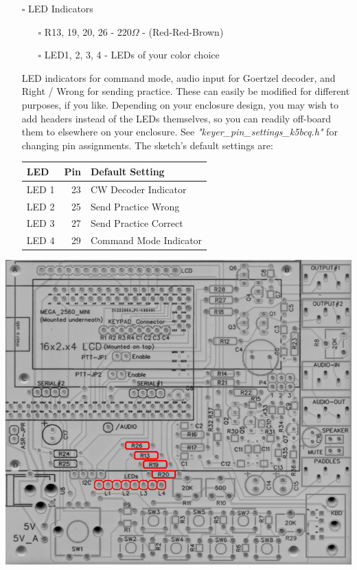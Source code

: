 \documentclass[11pt]{article}
\begin{document}
\newpage
\begin{itemize}
\item[{$\square$}] LED Indicators
\begin{itemize}
\item[{$\square$}] R13, 19, 20, 26 - 220\(\Omega\) - (Red-Red-Brown)
\item[{$\square$}] LED1, 2, 3, 4 - LEDs of your color choice
\end{itemize}

LED indicators for command mode, audio input for Goertzel decoder, and Right / Wrong for sending practice.  These can easily be modified for different purposes, if you like.  Depending on your enclosure design, you may wish to add headers instead of the LEDs themselves, so you can readily off-board them to elsewhere on your enclosure.  See \emph{"keyer\_pin\_settings\_k5bcq.h"} for changing pin assignments.  The sketch's default settings are:

\begin{center}
\begin{tabular}{lrl}
LED & Pin & Default Setting\\
\hline
LED 1 & 23 & CW Decoder Indicator\\
LED 2 & 25 & Send Practice Wrong\\
LED 3 & 27 & Send Practice Correct\\
LED 4 & 29 & Command Mode Indicator\\
\end{tabular}
\end{center}
\end{itemize}
\begin{center}
\includegraphics[width=.9\linewidth]{../png/3.4/pcb-top-led-indicators.png}
\end{center}
\end{document}
